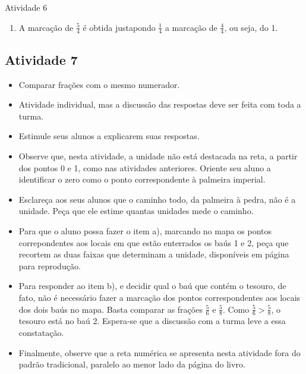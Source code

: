 \documentclass[oneside]{book}
\begin{document}
\begin{multicols}{2}
\begin{resposta*}{Atividade 6}
\begin{enumerate} [\quad a)]
    \item       A marcação de       $\frac{5}{4}$       é obtida justapondo       $\frac{1}{4}$       a marcação de       $\frac{4}{4}$, ou seja, do 1.

    
 
    \end{enumerate} %
  
\end{resposta*}


\subsection{Atividade 7}

\begin{itemize} %
    \item       Comparar frações com o mesmo numerador.
\end{itemize} %
  
\begin{itemize} %
    \item       Atividade individual, mas a discussão das respostas deve ser feita com toda a turma.
    \item       Estimule seus alunos a explicarem suas respostas.
    \item       Observe que, nesta atividade, a unidade não está destacada na reta, a partir dos pontos 0 e 1, como nas atividades anteriores. Oriente seu aluno a identificar o zero como o ponto correspondente à palmeira imperial. 
    \item       Esclareça aos seus alunos que o caminho todo, da palmeira à pedra, não é a unidade. Peça que ele estime quantas unidades mede o caminho.
    \item       Para que o aluno possa fazer o item a), marcando no mapa os pontos correpondentes aos locais em que estão enterrados os baús 1 e 2, peça que recortem as duas faixas que determinam a unidade, disponíveis em página para reprodução.  
    \item       Para responder ao item b), e decidir qual o baú que contém o tesouro, de fato, não é necessário fazer a marcação dos pontos correspondentes aos locais dos dois baús no mapa. Basta comparar as frações       $\frac{5}{6}$       e       $\frac{5}{8}$. Como        $\frac{5}{6}  > \frac{5}{8}$, o tesouro está no baú 2.  Espera-se que a discussão com a turma leve a essa constatação. 
    \item       Finalmente, observe que a reta numérica se apresenta nesta atividade fora do padrão tradicional, paralelo ao menor lado da página do livro.
\end{itemize} %


\end{multicols}
\end{document}
